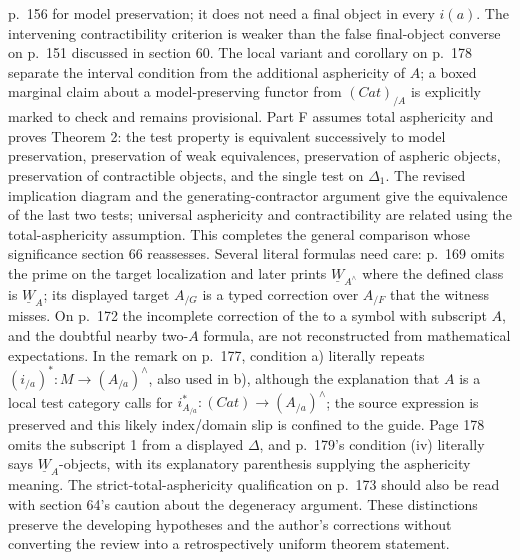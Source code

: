 p.~156 for model preservation; it does not need a final object in every $i(a)$. The intervening contractibility criterion is weaker than the false final-object converse on p.~151 discussed in section 60. The local variant and corollary on p.~178 separate the interval condition from the additional asphericity of $A$; a boxed marginal claim about a model-preserving functor from $(Cat)_{/A}$ is explicitly marked to check and remains provisional. Part F assumes total asphericity and proves Theorem 2: the test property is equivalent successively to model preservation, preservation of weak equivalences, preservation of aspheric objects, preservation of contractible objects, and the single test on $\Delta_1$. The revised implication diagram and the generating-contractor argument give the equivalence of the last two tests; universal asphericity and contractibility are related using the total-asphericity assumption. This completes the general comparison whose significance section 66 reassesses. Several literal formulas need care: p.~169 omits the prime on the target localization and later prints $\underline W_{A^\wedge}$ where the defined class is $\underline W_A$; its displayed target $A_{/G}$ is a typed correction over $A_{/F}$ that the witness misses. On p.~172 the incomplete correction of the to a symbol with subscript $A$, and the doubtful nearby two-$A$ formula, are not reconstructed from mathematical expectations. In the remark on p.~177, condition a) literally repeats $(i_{/a})^*:M\to(A_{/a})^\wedge$, also used in b), although the explanation that $A$ is a local test category calls for $i_{A_{/a}}^*:(Cat)\to(A_{/a})^\wedge$; the source expression is preserved and this likely index/domain slip is confined to the guide. Page 178 omits the subscript 1 from a displayed $\Delta$, and p.~179's condition (iv) literally says $\underline W_A$-objects, with its explanatory parenthesis supplying the asphericity meaning. The strict-total-asphericity qualification on p.~173 should also be read with section 64's caution about the degeneracy argument. These distinctions preserve the developing hypotheses and the author's corrections without converting the review into a retrospectively uniform theorem statement.

